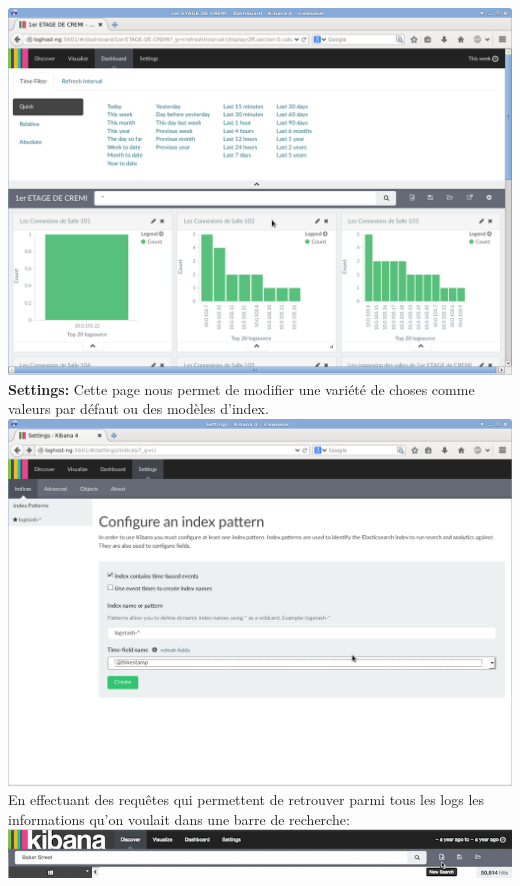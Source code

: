 \documentclass[11pt,a4paper]{article}
\begin{document}
\includegraphics[scale=0.3]{dashboard.png} \\

\textbf{Settings:} Cette page nous permet de modifier une variété de choses comme valeurs par défaut ou des modèles d'index.\\

\includegraphics[scale=0.3]{settings.png} \\

En effectuant des requêtes qui permettent de retrouver parmi tous les logs les
informations qu'on voulait dans une barre de recherche:\\

\includegraphics[scale=0.5]{Discover-New-Search.png} \\
\end{document}
